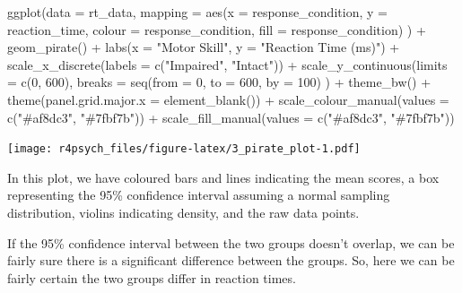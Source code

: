 \documentclass[
]{book}
\newenvironment{Shaded}{\begin{snugshade}}{\end{snugshade}}
\newcommand{\AttributeTok}[1]{\textcolor[rgb]{0.77,0.63,0.00}{#1}}
\newcommand{\DecValTok}[1]{\textcolor[rgb]{0.00,0.00,0.81}{#1}}
\newcommand{\FunctionTok}[1]{\textcolor[rgb]{0.00,0.00,0.00}{#1}}
\newcommand{\NormalTok}[1]{#1}
\newcommand{\SpecialCharTok}[1]{\textcolor[rgb]{0.00,0.00,0.00}{#1}}
\newcommand{\StringTok}[1]{\textcolor[rgb]{0.31,0.60,0.02}{#1}}
\begin{document}
\begin{Shaded}
\begin{Highlighting}[]
\FunctionTok{ggplot}\NormalTok{(}\AttributeTok{data =}\NormalTok{ rt\_data, }
       \AttributeTok{mapping =} \FunctionTok{aes}\NormalTok{(}\AttributeTok{x =}\NormalTok{ response\_condition, }
                     \AttributeTok{y =}\NormalTok{ reaction\_time,}
                     \AttributeTok{colour =}\NormalTok{ response\_condition,}
                     \AttributeTok{fill =}\NormalTok{ response\_condition)}
\NormalTok{       ) }\SpecialCharTok{+}
  \FunctionTok{geom\_pirate}\NormalTok{() }\SpecialCharTok{+}
  \FunctionTok{labs}\NormalTok{(}\AttributeTok{x =} \StringTok{"Motor Skill"}\NormalTok{, }\AttributeTok{y =} \StringTok{"Reaction Time (ms)"}\NormalTok{) }\SpecialCharTok{+}
  \FunctionTok{scale\_x\_discrete}\NormalTok{(}\AttributeTok{labels =} \FunctionTok{c}\NormalTok{(}\StringTok{"Impaired"}\NormalTok{, }\StringTok{"Intact"}\NormalTok{)) }\SpecialCharTok{+}
  \FunctionTok{scale\_y\_continuous}\NormalTok{(}\AttributeTok{limits =} \FunctionTok{c}\NormalTok{(}\DecValTok{0}\NormalTok{, }\DecValTok{600}\NormalTok{), }
                     \AttributeTok{breaks =} \FunctionTok{seq}\NormalTok{(}\AttributeTok{from =} \DecValTok{0}\NormalTok{, }\AttributeTok{to =} \DecValTok{600}\NormalTok{, }\AttributeTok{by =} \DecValTok{100}\NormalTok{)}
\NormalTok{                     ) }\SpecialCharTok{+}
  \FunctionTok{theme\_bw}\NormalTok{() }\SpecialCharTok{+}
  \FunctionTok{theme}\NormalTok{(}\AttributeTok{panel.grid.major.x =} \FunctionTok{element\_blank}\NormalTok{()) }\SpecialCharTok{+}
  \FunctionTok{scale\_colour\_manual}\NormalTok{(}\AttributeTok{values =} \FunctionTok{c}\NormalTok{(}\StringTok{"\#af8dc3"}\NormalTok{, }\StringTok{"\#7fbf7b"}\NormalTok{)) }\SpecialCharTok{+}
  \FunctionTok{scale\_fill\_manual}\NormalTok{(}\AttributeTok{values =} \FunctionTok{c}\NormalTok{(}\StringTok{"\#af8dc3"}\NormalTok{, }\StringTok{"\#7fbf7b"}\NormalTok{))}
\end{Highlighting}
\end{Shaded}

\texttt{[image: r4psych\_files/figure-latex/3\_pirate\_plot-1.pdf]}

In this plot, we have coloured bars and lines indicating the mean scores, a box representing the 95\% confidence interval assuming a normal sampling distribution, violins indicating density, and the raw data points.

If the 95\% confidence interval between the two groups doesn't overlap, we can be fairly sure there is a significant difference between the groups. So, here we can be fairly certain the two groups differ in reaction times.
\end{document}

